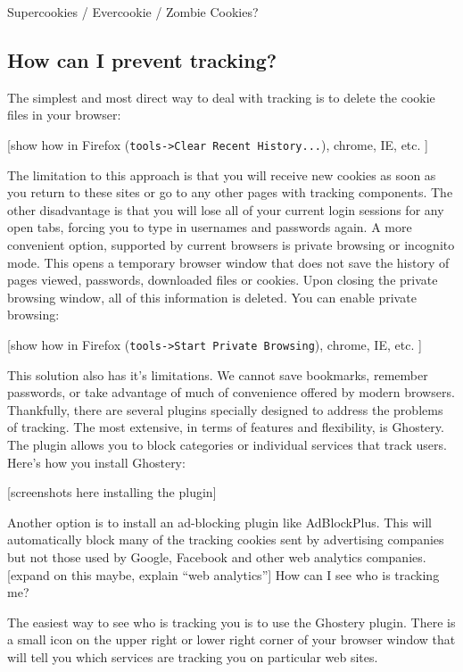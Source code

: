 Supercookies / Evercookie / Zombie Cookies?

\subsection{How can I prevent tracking?}

The simplest and most direct way to deal with tracking is to delete the
cookie files in your browser:

{[}show how in Firefox (\verb!tools->Clear Recent History...!), chrome,
IE, etc. {]}

The limitation to this approach is that you will receive new cookies as
soon as you return to these sites or go to any other pages with tracking
components. The other disadvantage is that you will lose all of your
current login sessions for any open tabs, forcing you to type in
usernames and passwords again. A more convenient option, supported by
current browsers is private browsing or incognito mode. This opens a
temporary browser window that does not save the history of pages viewed,
passwords, downloaded files or cookies. Upon closing the private
browsing window, all of this information is deleted. You can enable
private browsing:

{[}show how in Firefox (\verb!tools->Start Private Browsing!), chrome,
IE, etc. {]}

This solution also has it's limitations. We cannot save bookmarks,
remember passwords, or take advantage of much of convenience offered by
modern browsers. Thankfully, there are several plugins specially
designed to address the problems of tracking. The most extensive, in
terms of features and flexibility, is Ghostery. The plugin allows you to
block categories or individual services that track users. Here's how you
install Ghostery:

{[}screenshots here installing the plugin{]}

Another option is to install an ad-blocking plugin like AdBlockPlus.
This will automatically block many of the tracking cookies sent by
advertising companies but not those used by Google, Facebook and other
web analytics companies. {[}expand on this maybe, explain ``web
analytics''{]} How can I see who is tracking me?

The easiest way to see who is tracking you is to use the Ghostery
plugin. There is a small icon on the upper right or lower right corner
of your browser window that will tell you which services are tracking
you on particular web sites.

